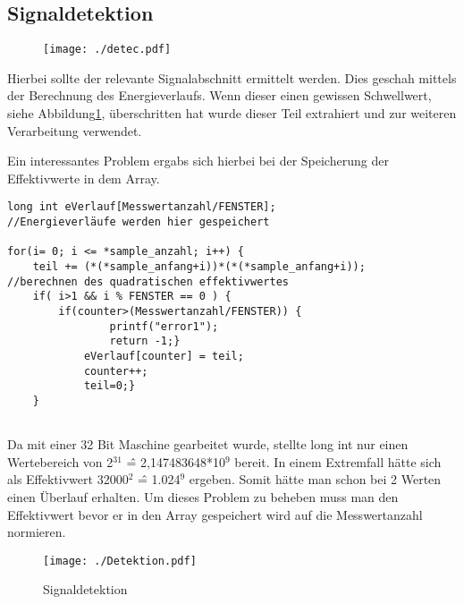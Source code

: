 \documentclass[a4paper,12pt]{article}
\begin{document}
\subsection{Signaldetektion}
\begin{figure}[!htp]
\centering
\texttt{[image: ./detec.pdf]}
\end{figure}

Hierbei sollte der relevante Signalabschnitt ermittelt werden. Dies geschah mittels der Berechnung des Energieverlaufs. Wenn dieser einen gewissen Schwellwert, siehe Abbildung\ref{Detektion}, überschritten hat wurde dieser Teil extrahiert
und zur weiteren Verarbeitung verwendet.

Ein interessantes Problem ergabs sich hierbei bei der Speicherung der Effektivwerte in dem Array.
\begin{lstlisting}[caption={detection.c}]
long int eVerlauf[Messwertanzahl/FENSTER];            //Energieverläufe werden hier gespeichert

for(i= 0; i <= *sample_anzahl; i++) {
	teil += (*(*sample_anfang+i))*(*(*sample_anfang+i));        //berechnen des quadratischen effektivwertes
	if( i>1 && i % FENSTER == 0 ) {
		if(counter>(Messwertanzahl/FENSTER)) {
				printf("error1");                                   
				return -1;}
			eVerlauf[counter] = teil;
			counter++;
			teil=0;}
	}
 
\end{lstlisting}
Da mit einer 32 Bit Maschine gearbeitet wurde, stellte long int nur einen Wertebereich von 2$^31$ \^= 2,147483648*10$^9$ bereit.
In einem Extremfall hätte sich als Effektivwert 32000$^2$ \^= 1.024$^9$ ergeben. Somit hätte man schon bei 2 Werten einen Überlauf erhalten.
Um dieses Problem zu beheben muss man den Effektivwert bevor er in den Array gespeichert wird auf die Messwertanzahl normieren.



\begin{figure}[!htp]
\centering
\texttt{[image: ./Detektion.pdf]}
\caption{Signaldetektion}
\label{Detektion}

\end{figure}
\newpage
\end{document}
